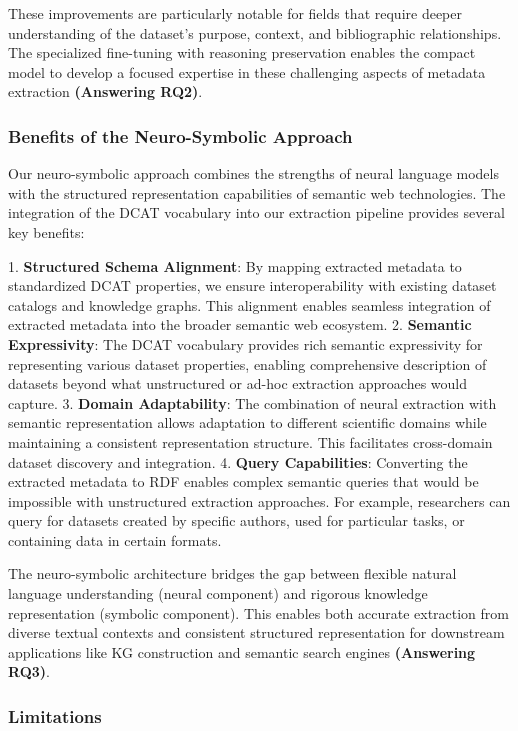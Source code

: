 \documentclass[runningheads]{llncs}
\begin{document}
These improvements are particularly notable for fields that require deeper understanding of the dataset's purpose, context, and bibliographic relationships. The specialized fine-tuning with reasoning preservation enables the compact model to develop a focused expertise in these challenging aspects of metadata extraction \textbf{(Answering RQ2)}.



\subsubsection{Benefits of the Neuro-Symbolic Approach}

Our neuro-symbolic approach combines the strengths of neural language models with the structured representation capabilities of semantic web technologies. The integration of the DCAT vocabulary into our extraction pipeline provides several key benefits:

1. \textbf{Structured Schema Alignment}: By mapping extracted metadata to standardized DCAT properties, we ensure interoperability with existing dataset catalogs and knowledge graphs. This alignment enables seamless integration of extracted metadata into the broader semantic web ecosystem.
2. \textbf{Semantic Expressivity}: The DCAT vocabulary provides rich semantic expressivity for representing various dataset properties, enabling comprehensive description of datasets beyond what unstructured or ad-hoc extraction approaches would capture.
3. \textbf{Domain Adaptability}: The combination of neural extraction with semantic representation allows adaptation to different scientific domains while maintaining a consistent representation structure. This facilitates cross-domain dataset discovery and integration.
4. \textbf{Query Capabilities}: Converting the extracted metadata to RDF enables complex semantic queries that would be impossible with unstructured extraction approaches. For example, researchers can query for datasets created by specific authors, used for particular tasks, or containing data in certain formats.

The neuro-symbolic architecture bridges the gap between flexible natural language understanding (neural component) and rigorous knowledge representation (symbolic component). This enables both accurate extraction from diverse textual contexts and consistent structured representation for downstream applications like KG construction and semantic search engines \textbf{(Answering RQ3)}.

\subsubsection{Limitations}
\end{document}
